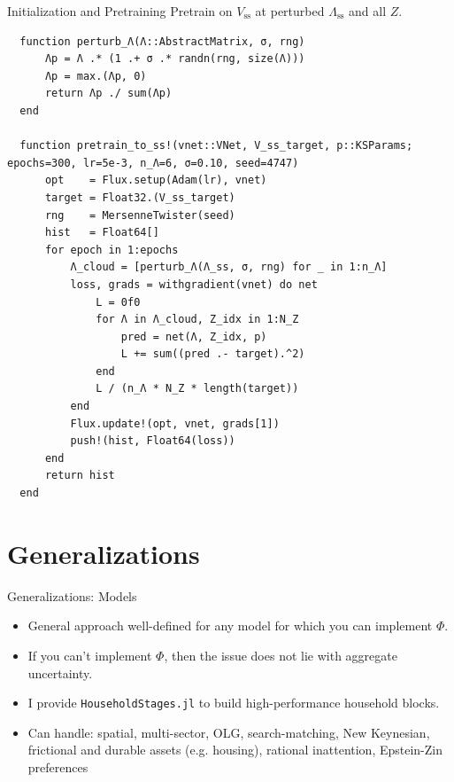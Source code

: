 \documentclass[10pt,aspectratio=169]{beamer}
\begin{document}
\begin{frame}[fragile]{Initialization and Pretraining}
  Pretrain on $V_{\mathrm{ss}}$ at perturbed $\Lambda_{\mathrm{ss}}$ and all $Z$.
  \begin{lstlisting}
  function perturb_Λ(Λ::AbstractMatrix, σ, rng)
      Λp = Λ .* (1 .+ σ .* randn(rng, size(Λ)))
      Λp = max.(Λp, 0)
      return Λp ./ sum(Λp)
  end

  function pretrain_to_ss!(vnet::VNet, V_ss_target, p::KSParams; epochs=300, lr=5e-3, n_Λ=6, σ=0.10, seed=4747)
      opt    = Flux.setup(Adam(lr), vnet)
      target = Float32.(V_ss_target)
      rng    = MersenneTwister(seed)
      hist   = Float64[]
      for epoch in 1:epochs
          Λ_cloud = [perturb_Λ(Λ_ss, σ, rng) for _ in 1:n_Λ]
          loss, grads = withgradient(vnet) do net
              L = 0f0
              for Λ in Λ_cloud, Z_idx in 1:N_Z
                  pred = net(Λ, Z_idx, p)
                  L += sum((pred .- target).^2)
              end
              L / (n_Λ * N_Z * length(target))
          end
          Flux.update!(opt, vnet, grads[1])
          push!(hist, Float64(loss))
      end
      return hist
  end
  \end{lstlisting}
\end{frame}

\section[Generalizations]{Generalizations}

\begin{frame}{Generalizations: Models}
  \begin{itemize}
    \item General approach well-defined for any model for which you can implement $\Phi$.
    \item If you can't implement $\Phi$, then the issue does not lie with aggregate uncertainty.
    \item I provide \texttt{HouseholdStages.jl} to build high-performance household blocks.
    \item Can handle: spatial, multi-sector, OLG, search-matching, New Keynesian, frictional and durable assets (e.g. housing), rational inattention, Epstein-Zin preferences
  \end{itemize}  
\end{frame}
\end{document}
